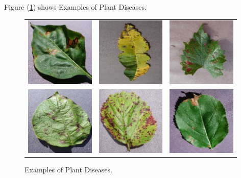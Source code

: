 \noindent Figure (\ref{fig:exmaplePlantDis}) shows Examples of Plant Diseases.
\begin{figure}[H]
  \centering
  \begin{tabular}{ccc}
      \includegraphics[width=3.3cm]{photos/chapter05/17.jpg} & \includegraphics[width=3.3cm]{photos/chapter05/18.jpg} 
      & \includegraphics[width=3.3cm]{photos/chapter05/19.jpg} \\[3pt]
      \includegraphics[width=3.3cm]{photos/chapter05/20.jpg} & \includegraphics[width=3.3cm]{photos/chapter05/21.jpg} 
      & \includegraphics[width=3.3cm]{photos/chapter05/22.jpg} \\[3pt]
  \end{tabular}
  \caption{Examples of Plant Diseases.}
  \label{fig:exmaplePlantDis}
\end{figure}


